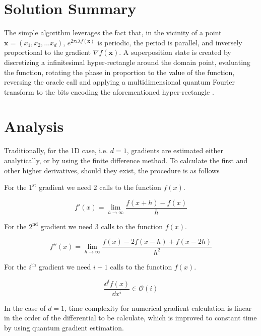 \documentclass{article}
\begin{document}
\section{Solution Summary}


The simple algorithm leverages the fact that, in the vicinity of a point \(\mathbf{x} = (x_1, x_2, \ldots x_d)\),
\(e^{2 \pi \iota \lambda f(\mathbf{x})}\) is periodic, the period is parallel, and inversely
proportional to the gradient \(\nabla f(\mathbf{x})\). A superposition state is created by
discretizing a infinitesimal hyper-rectangle around the domain point, evaluating the function,
rotating the phase in proportion to the value of the function, reversing the oracle call and
applying a multidimensional quantum Fourier transform to the bits encoding the aforementioned
hyper-rectangle \cite{quant-ph/0507109}.

\section{Analysis}

Traditionally, for the 1D case, i.e. \(d = 1\), gradients are estimated either analytically, or by
using the finite difference method. To calculate the first and other higher derivatives,
should they exist, the procedure is as follows

For the \(1^{\text{st}}\) gradient we need  \(2\) calls to the function \(f(x)\).

\begin{equation}
  f'(x) =  \lim_{h \to \infty} \frac{f(x + h) - f(x)}{h}
\end{equation}

For the \(2^{\text{nd}}\) gradient we need  \(3\) calls to the function \(f(x)\).

\begin{equation}
  f''(x) =  \lim_{h \to \infty} \frac{f(x) - 2f(x - h) + f(x - 2h)}{h^2}
\end{equation}

For the \(i^{\text{th}}\) gradient we need  \(i + 1\) calls to the function \(f(x)\).

\begin{equation}
  \frac{\dd^i f(x)}{\dd x^i} \in \mathcal{O}(i)
\end{equation}

In the case of \(d = 1\), time complexity for numerical gradient calculation is linear in the order
of the differential to be calculate, which is improved to constant time by
using quantum gradient estimation.
\end{document}

